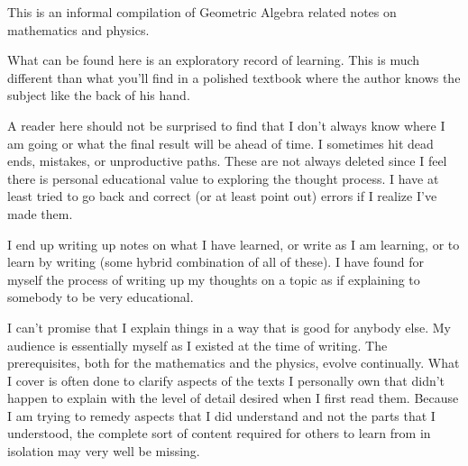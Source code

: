 This is an informal compilation of Geometric Algebra related notes on
mathematics and physics.

What can be found here is an exploratory record of learning.  This is much different than what you'll find in a polished textbook where the author knows the subject like the back of his hand.  

A reader here should not be surprised to find that I don't always know where I am going or what the final result will be ahead of time.  I sometimes hit dead ends, mistakes, or unproductive paths.  These are not always deleted since I feel there is personal educational value to exploring the thought process.  I have at least tried to go back and correct (or at least point out) errors if I realize I've made them.

I end up writing up notes on what I have learned, or write as I am learning, or to learn by writing (some hybrid combination of all of these).
I have found for myself the process of writing up 
my thoughts on a topic as if explaining to somebody to be very educational.

I can't promise that I explain things in a way that is good for anybody else.  My audience is essentially myself as I existed at the time of writing.  The prerequisites, both for the mathematics and the physics, evolve continually.  What I cover is often done to clarify aspects of the texts I personally own that didn't happen to explain with the level of detail desired when I first read them.  Because I am trying to remedy aspects that I did understand and not the parts that I understood, the complete sort of content required for others to learn from in isolation may very well be missing.


